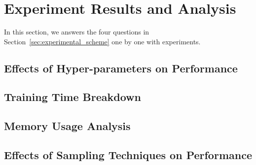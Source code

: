 \section{Experiment Results and Analysis}
\label{sec:experiment_results}

In this section, we answers the four questions in Section~\ref{sec:experimental_scheme} one by one with experiments.

\subsection{Effects of Hyper-parameters on Performance}
\label{sec:effects_of_hyper-parameters_on_performance}

\subsection{Training Time Breakdown}
\label{sec:training_time_breakdown}

\subsection{Memory Usage Analysis}
\label{sec:memory_usage_analysis}

\subsection{Effects of Sampling Techniques on Performance}
\label{sec:effects_of_sampling_techniques_on_performance}